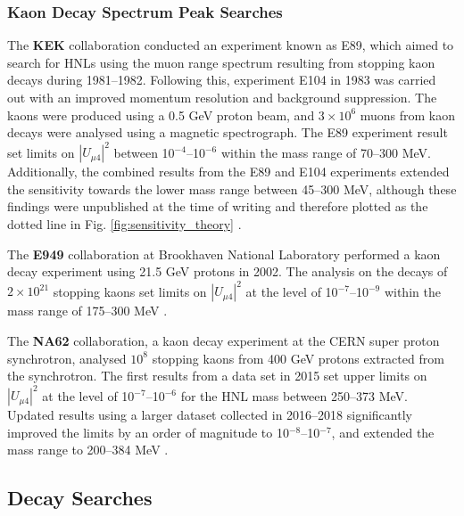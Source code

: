 \subsubsection{Kaon Decay Spectrum Peak Searches}

\begin{coloritemize}
\item The \textbf{KEK} collaboration conducted an experiment known as E89, which aimed to search for HNLs using the muon range spectrum resulting from stopping kaon decays during 1981--1982. 
Following this, experiment E104 in 1983 was carried out with an improved momentum resolution and background suppression.
The kaons were produced using a 0.5 GeV proton beam, and $3 \times 10^{6}$ muons from kaon decays were analysed using a magnetic spectrograph.
The E89 experiment result set limits on $|U_{\mu4}|^{2}$ between 10$^{-4}$--10$^{-6}$ within the mass range of 70--300 MeV.
Additionally, the combined results from the E89 and E104 experiments extended the sensitivity towards the lower mass range between 45--300 MeV, although these findings were unpublished at the time of writing and therefore plotted as the dotted line in Fig. \ref{fig:sensitivity_theory} \cite{KEK1, KEK2, KEK3}.

\item The \textbf{E949} collaboration at Brookhaven National Laboratory performed a kaon decay experiment using 21.5 GeV protons in 2002.
The analysis on the decays of $2 \times 10^{21}$ stopping kaons set limits on $|U_{\mu4}|^{2}$ at the level of 10$^{-7}$--10$^{-9}$ within the mass range of 175--300 MeV \cite{E949}.

\item The \textbf{NA62} collaboration, a kaon decay experiment at the CERN super proton synchrotron, analysed $10^{8}$ stopping kaons from 400 GeV protons extracted from the synchrotron.
The first results from a data set in 2015 set upper limits on $|U_{\mu4}|^{2}$ at the level of 10$^{-7}$--10$^{-6}$ for the HNL mass between 250--373 MeV.
Updated results using a larger dataset collected in 2016--2018 significantly improved the limits by an order of magnitude to 10$^{-8}$--10$^{-7}$, and extended the mass range to 200--384 MeV \cite{NA62A, NA62B}.
\end{coloritemize}

\subsection{Decay Searches}
\label{sec:decaysearch}

